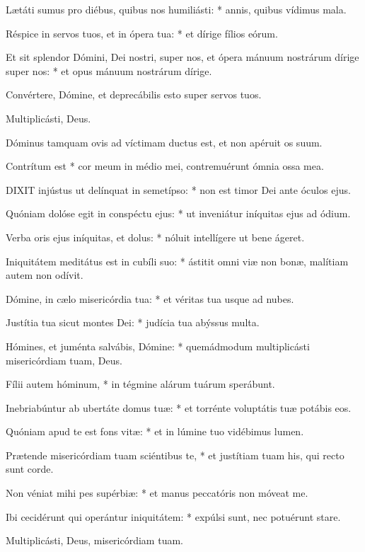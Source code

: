 Lætáti sumus pro diébus, quibus nos humiliásti: * annis, quibus vídimus mala.

Réspice in servos tuos, et in ópera tua: * et dírige fílios eórum.

Et sit splendor Dómini, Dei nostri, super nos, et ópera mánuum nostrárum dírige super nos: * et opus mánuum nostrárum dírige.

 Convértere, Dómine, et deprecábilis esto super servos tuos.

 Multiplicásti, Deus.


 Dóminus tamquam ovis ad víctimam ductus est, et non apéruit os suum.

 Contrítum est * cor meum in médio mei, contremuérunt ómnia ossa mea.


\lettrine[lines=2]{D}{IXIT} injústus ut delínquat in semetípso: * non est timor Dei ante óculos ejus.

Quóniam dolóse egit in conspéctu ejus: * ut inveniátur iníquitas ejus ad ódium.

Verba oris ejus iníquitas, et dolus: * nóluit intellígere ut bene ágeret.

Iniquitátem meditátus est in cubíli suo: * ástitit omni viæ non bonæ, malítiam autem non odívit.

Dómine, in cælo misericórdia tua: * et véritas tua usque ad nubes.

Justítia tua sicut montes Dei: * judícia tua abýssus multa.

Hómines, et juménta salvábis, Dómine: * quemádmodum multiplicásti misericórdiam tuam, Deus.

Fílii autem hóminum, * in tégmine alárum tuárum sperábunt.

Inebriabúntur ab ubertáte domus tuæ: * et torrénte voluptátis tuæ potábis eos.

Quóniam apud te est fons vitæ: * et in lúmine tuo vidébimus lumen.

Prætende misericórdiam tuam sciéntibus te, * et justítiam tuam his, qui recto sunt corde.

Non véniat mihi pes supérbiæ: * et manus peccatóris non móveat me.

Ibi cecidérunt qui operántur iniquitátem: * expúlsi sunt, nec potuérunt stare.

 Multiplicásti, Deus, misericórdiam tuam.

